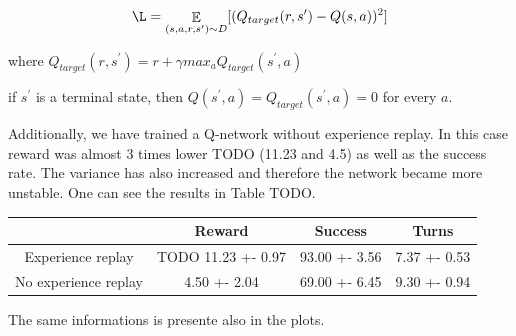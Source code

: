 \documentclass[12pt,titlepage,a4paper]{article}
\DeclareMathOperator*{\E}{\mathbb{E}}
\begin{document}
\[\L = \E_{(s, a, r, s^\prime) \sim D} [(Q_{target}(r,s^\prime) - Q(s, a))^2]\]

where $Q_{target}(r, s^\prime) = r + \gamma max_{a}Q_{target}(s^\prime,a)$

if $s^\prime$ is a terminal state, then $Q(s^\prime, a) = Q_{target}(s^\prime, a) = 0$ for every $a$.

Additionally, we have trained a Q-network without experience replay. In this case reward was almost 3 times lower TODO (11.23 and 4.5) as well as the success rate. The variance has also increased and therefore the network became more unstable. One can see the results in Table TODO.

\begin{center}
    \begin{tabular}{||c c c c||} 
     \hline
      & Reward & Success & Turns \\ [0.5ex] 
     \hline\hline
     Experience replay & TODO 11.23 +- 0.97 & 93.00 +- 3.56 & 7.37 +- 0.53 \\ 
     \hline
     No experience replay & 4.50 +- 2.04 & 69.00 +- 6.45 & 9.30 +- 0.94 \\
     \hline
    \end{tabular}
\end{center}

The same informations is presente also in the plots.
\end{document}
